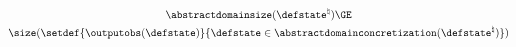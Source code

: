 \begin{gather*}
\abstractdomainsize(\defstate^\natural) \GE \\
\size(\setdef{\outputobs(\defstate)}{\defstate\in\abstractdomainconcretization(\defstate^\natural)})
\end{gather*}
